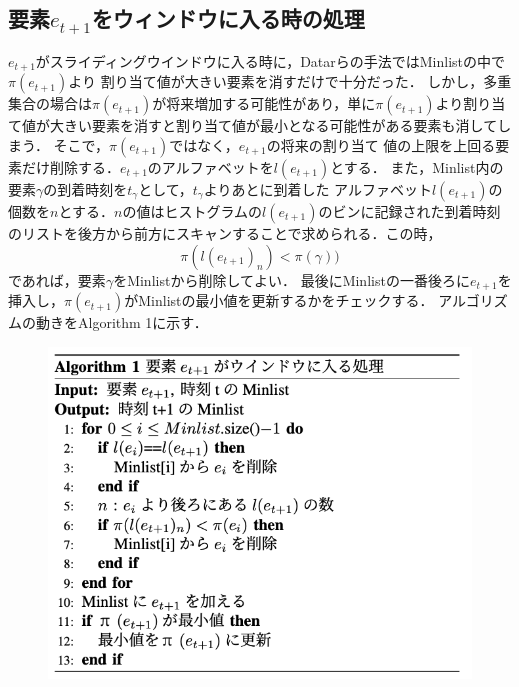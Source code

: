  \subsection{要素$e_{t+1}$をウィンドウに入る時の処理}
$e_{t+1}$がスライディングウインドウに入る時に，Datarらの手法ではMinlistの中で$\pi(e_{t+1})$より
割り当て値が大きい要素を消すだけで十分だった．
しかし，多重集合の場合は$\pi(e_{t+1})$が将来増加する可能性があり，単に$\pi(e_{t+1})$より割り当て値が大きい要素を消すと割り当て値が最小となる可能性がある要素も消してしまう．
そこで，$\pi(e_{t+1})$ではなく，$e_{t+1}$の将来の割り当て
値の上限を上回る要素だけ削除する．$e_{t+1}$のアルファベットを$l(e_{t+1})$とする．
また，Minlist内の要素$\gamma$の到着時刻を$t_{\gamma}$として，$t_{\gamma}$よりあとに到着した
アルファベット$l(e_{t+1})$の個数を$n$とする．$n$の値はヒストグラムの$l(e_{t+1})$のビンに記録された到着時刻
のリストを後方から前方にスキャンすることで求められる．この時，
$$\pi(l(e_{t+1})_{n})<\pi(\gamma))$$
であれば，要素$\gamma$をMinlistから削除してよい．
最後にMinlistの一番後ろに$e_{t+1}$を挿入し，$\pi(e_{t+1})$がMinlistの最小値を更新するかをチェックする．
アルゴリズムの動きをAlgorithm 1に示す．
\begin{figure}[H]
  \centering
  \includegraphics[width=12cm]{4_2_3.png}
    \label{fig:423}
\end{figure}


